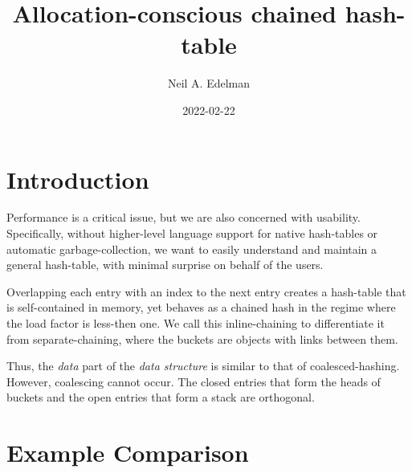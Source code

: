 \documentclass[12pt]{article}
\author{Neil A. Edelman}
\title{Allocation-conscious chained hash-table}
\date{2022-02-22}
\begin{document}
\maketitle


\section{Introduction}

Performance is a critical issue, but we are also concerned with usability. Specifically, without higher-level language support for native hash-tables or automatic garbage-collection, we want to easily understand and maintain a general hash-table, with minimal surprise on behalf of the users.

Overlapping each entry with an index to the next entry creates a hash-table that is self-contained in memory, yet behaves as a chained hash in the regime where the load factor is less-then one.\cite{knuth1998sorting} We call this inline-chaining to differentiate it from separate-chaining, where the buckets are objects with links between them.

Thus, the {\it data} part of the {\it data structure} is similar to that of coalesced-hashing\cite{williams1959handling}. However, coalescing cannot occur. The closed entries that form the heads of buckets and the open entries that form a stack are orthogonal.

\section{Example Comparison}
\end{document}
